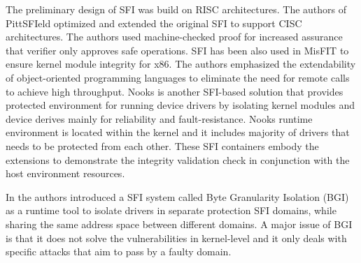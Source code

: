 The preliminary design of SFI was build on RISC
architectures. The authors of PittSFIeld \cite{PittSFIeld} optimized and
extended the original SFI to support CISC architectures. 
The authors used machine-checked proof for increased assurance that
verifier only approves safe operations.
%
SFI has been also used in MisFIT \cite{MISFit} to ensure kernel
module integrity for x86. The authors emphasized the
extendability of object-oriented programming languages to eliminate
the need for remote calls to achieve high throughput. 
%
Nooks \cite{Nooks:03} is another SFI-based solution that provides
protected environment for running device drivers by isolating kernel
modules and device derives mainly for reliability and
fault-resistance. Nooks runtime environment is located within the
kernel and it includes majority of drivers that needs to be protected
from each other. 
These SFI containers embody the extensions to demonstrate the integrity
validation check in conjunction with the host environment resources.

In \cite{Castro-BGI} the authors introduced a SFI system called Byte
Granularity Isolation (BGI) as a runtime tool to isolate drivers in
separate protection SFI domains, while sharing the same address space
between different domains. 
A major issue of BGI is that it
does not solve the vulnerabilities in kernel-level and it only deals
with specific attacks that aim to pass by a faulty domain.

